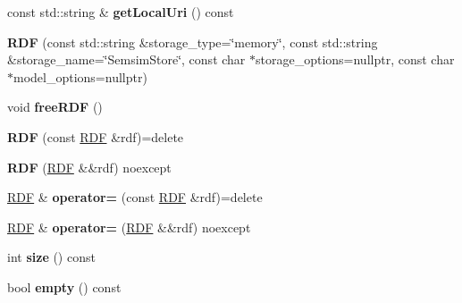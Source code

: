 \begin{DoxyCompactItemize}
\mbox{\label{classomexmeta_1_1RDF_a58b64a5972f74564994028504d8d227c}} 
const std\+::string \& {\bfseries get\+Local\+Uri} () const
\item 
\mbox{\label{classomexmeta_1_1RDF_aecb90e51830082f78ff055c045f4b439}} 
{\bfseries R\+DF} (const std\+::string \&storage\+\_\+type=\char`\"{}memory\char`\"{}, const std\+::string \&storage\+\_\+name=\char`\"{}Semsim\+Store\char`\"{}, const char $\ast$storage\+\_\+options=nullptr, const char $\ast$model\+\_\+options=nullptr)
\item 
\mbox{\label{classomexmeta_1_1RDF_add8f3d957f24a26785f29b85d50f4399}} 
void {\bfseries free\+R\+DF} ()
\item 
\mbox{\label{classomexmeta_1_1RDF_ad95c4a8588988efe399c7f984e304990}} 
{\bfseries R\+DF} (const \hyperlink{classomexmeta_1_1RDF}{R\+DF} \&rdf)=delete
\item 
\mbox{\label{classomexmeta_1_1RDF_a6490b2ea0d10e3026bea587a305b7fb9}} 
{\bfseries R\+DF} (\hyperlink{classomexmeta_1_1RDF}{R\+DF} \&\&rdf) noexcept
\item 
\mbox{\label{classomexmeta_1_1RDF_a9d1b20d798969d3c1dac412c621247b9}} 
\hyperlink{classomexmeta_1_1RDF}{R\+DF} \& {\bfseries operator=} (const \hyperlink{classomexmeta_1_1RDF}{R\+DF} \&rdf)=delete
\item 
\mbox{\label{classomexmeta_1_1RDF_ae3739bda3be0986547c31559381f3df4}} 
\hyperlink{classomexmeta_1_1RDF}{R\+DF} \& {\bfseries operator=} (\hyperlink{classomexmeta_1_1RDF}{R\+DF} \&\&rdf) noexcept
\item 
\mbox{\label{classomexmeta_1_1RDF_a63247bb3a05957abf7320c060543c3ca}} 
int {\bfseries size} () const
\item 
\mbox{\label{classomexmeta_1_1RDF_ab6525e8db606ffd48425b05ad2a204d8}} 
bool {\bfseries empty} () const
\item 
\mbox{\label{classomexmeta_1_1RDF_a9a29912bc44d47d371a2357b75194fc3}} 

\end{DoxyCompactItemize}
